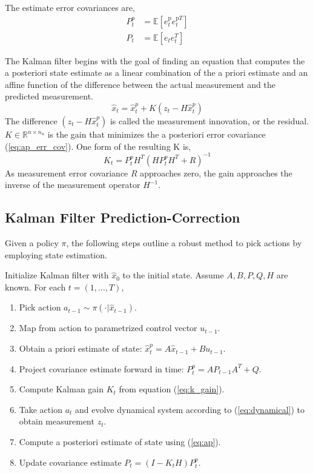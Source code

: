 \documentclass{article}
\begin{document}
The estimate error covariances are,
\begin{align}
	P^p_t &= \mathbb{E}\left[e^{\text{p}}_t e^{\text{p}T}_t \right]  \\
	P_t &= \mathbb{E}\left[e_t e_t^{T} \right] \label{eq:ap_err_cov}
\end{align}

The Kalman filter begins with the goal of finding an equation that computes the a posteriori state estimate as a linear combination of the a priori estimate and an affine function of the difference between the actual measurement and the predicted measurement.
\begin{equation}
	\hat{x}_t = \hat{x}_t^p + K(z_t - H\hat{x}_t^p)
	\label{eq:ap}
\end{equation}
The difference $(z_t - H\hat{x}_t^p)$ is called the measurement innovation, or the residual.  $K \in \mathbb{R}^{n \times n_u}$ is the gain that minimizes the a posteriori error covariance (\ref{eq:ap_err_cov}). One form of the resulting K \cite{maybeck1982stochastic} is, 
\begin{equation}
	K_t = P_t^p H^T(HP_t^pH^T + R)^{-1}
	\label{eq:k_gain}
\end{equation}
As measurement error covariance $R$ approaches zero, the gain approaches the inverse of the measurement operator $H^{-1}$. 

\subsection{Kalman Filter Prediction-Correction}
Given a policy $\pi$, the following steps outline a robust method to pick actions by employing state estimation. 

Initialize Kalman filter with $\hat{x}_0$ to the initial state. Assume $A, B, P, Q, H$ are known. For each $t = (1, \ldots, T)$, 
\begin{enumerate}
	\item Pick action $a_{t-1} \sim \pi(\cdot | \hat{x}_{t-1})$. 
	\item Map from action to parametrized control vector $u_{t-1}$.
	\item Obtain a priori estimate of state: $\hat{x}_t^p = A\hat{x}_{t-1} + Bu_{t-1}$.
	\item Project covariance estimate forward in time: $P_{t}^p = AP_{t-1}A^T + Q$.
	\item Compute Kalman gain $K_t$ from equation (\ref{eq:k_gain}).
	\item Take action $a_t$ and evolve dynamical system according to (\ref{eq:dynamical}) to obtain measurement $z_t$.
	\item Compute a posteriori estimate of state using (\ref{eq:ap}).
	\item Update covariance estimate $P_t = (I - K_tH)P_t^p$.
\end{enumerate}
\end{document}

